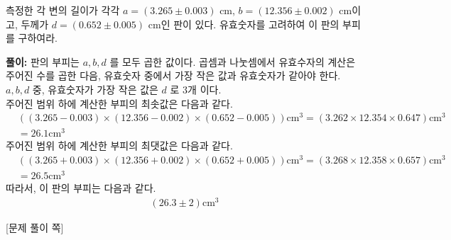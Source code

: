 \documentclass[floatfix,nofootinbib,superscriptaddress,fleqn,preprint]{revtex4-2}
\begin{document}
\newpage 


  측정한 각 변의 길이가 각각
$a=(3.265\pm0.003)$ cm, $b=(12.356\pm0.002)$ cm이고, 두께가
$d=(0.652\pm0.005)$ cm인 판이 있다. 유효숫자를 고려하여 이 판의 부피를 
구하여라. 

\noindent \textbf{풀이:} 판의 부피는 $a,b,d$ 를 모두 곱한 값이다. 곱셈과 나눗셈에서 유효수자의 계산은 주어진 수를 곱한 다음,
유효숫자 중에서 가장 작은 값과 유효숫자가 같아야 한다. $a,b,d$ 중, 유효숫자가 가장 작은 값은 $d$ 로 3개 이다. \\주어진 범위 하에
계산한 부피의 최솟값은 다음과 같다.
\begin{align*}
&((3.265-0.003)\times (12.356-0.002)\times (0.652-0.005))\mathrm{cm}^3=(3.262 \times 12.354 \times 0.647)\mathrm{cm}^3
  \\ &= 26.1\mathrm{cm}^3&&
\end{align*}
주어진 범위 하에 계산한 부피의 최댓값은 다음과 같다.
\begin{align*}
  &((3.265+0.003)\times (12.356+0.002)\times (0.652+0.005))\mathrm{cm}^3=(3.268 \times 12.358 \times 0.657)\mathrm{cm}^3
  \\ &= 26.5\mathrm{cm}^3&&  
\end{align*}
따라서, 이 판의 부피는 다음과 같다.
\begin{align*}
  (26.3\pm 2)\mathrm{cm}^3
\end{align*}
\newpage

{\color{gray} [문제 풀이 쪽]}

\newpage 
\end{document}
